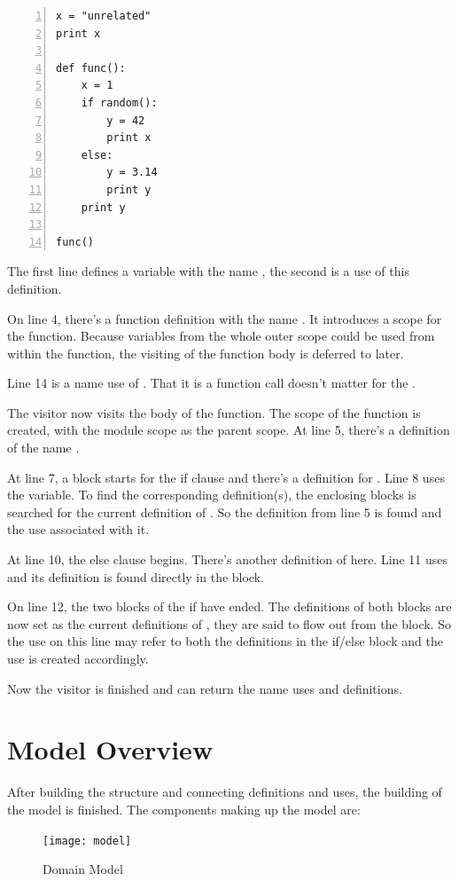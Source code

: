 \documentclass[12pt,halfparskip,DIV11,BCOR10mm]{scrreprt}
\begin{document}
\begin{lstlisting}[numbers=left]
x = "unrelated"
print x

def func():
    x = 1
    if random():
        y = 42
        print x
    else:
        y = 3.14
        print y
    print y

func()
\end{lstlisting}

The first line defines a variable with the name , the second is a use of this definition.

On line 4, there's a function definition with the name . It introduces a scope for the function. Because variables from the whole outer scope could be used from within the function, the visiting of the function body is deferred to later.

Line 14 is a name use of . That it is a function call doesn't matter for the .

The visitor now visits the body of the function. The scope of the function is created, with the module scope as the parent scope. At line 5, there's a definition of the name .

At line 7, a block starts for the if clause and there's a definition for . Line 8 uses the  variable. To find the corresponding definition(s), the enclosing blocks is searched for the current definition of . So the definition from line 5 is found and the use associated with it.

At line 10, the else clause begins. There's another definition of  here. Line 11 uses  and its definition is found directly in the block.

On line 12, the two blocks of the if have ended. The definitions of both blocks are now set as the current definitions of , they are said to flow out from the block. So the use on this line may refer to both the definitions in the if/else block and the use is created accordingly.

Now the visitor is finished and can return the name uses and definitions.

\section{Model Overview}

After building the structure and connecting definitions and uses, the building of the model is finished. The components making up the model are:

\begin{figure}[H]
    \centering
    \texttt{[image: model]}
    \label{fig:model}
    \caption{Domain Model}
\end{figure}
\end{document}
